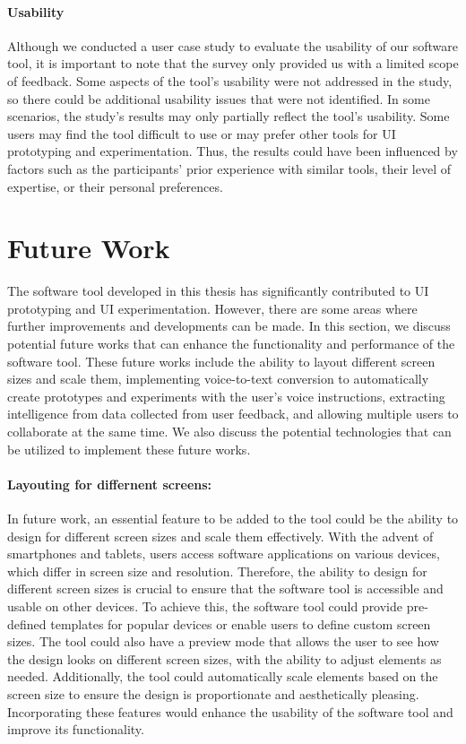 \paragraph{Usability}
Although we conducted a user case study to evaluate the usability of our software tool, it is important to note that the survey only provided us with a limited scope of feedback. 
Some aspects of the tool's usability were not addressed in the study, so there could be additional usability issues that were not identified. In some scenarios, the study's results may only partially reflect the tool's usability.
Some users may find the tool difficult to use or may prefer other tools for UI prototyping and experimentation.
Thus, the results could have been influenced by factors such as the participants' prior experience with similar tools, their level of expertise, or their personal preferences.

\clearpage
\section{Future Work}
\label{section:conclusion:futurework}
The software tool developed in this thesis has significantly contributed to UI prototyping and UI experimentation. 
However, there are some areas where further improvements and developments can be made. 
In this section, we discuss potential future works that can enhance the functionality and performance of the software tool. 
These future works include the ability to layout different screen sizes and scale them, implementing voice-to-text conversion to automatically create prototypes and experiments with the user's voice instructions, extracting intelligence from data collected from user feedback, and allowing multiple users to collaborate at the same time. 
We also discuss the potential technologies that can be utilized to implement these future works.

\paragraph{Layouting for differnent screens:}
In future work, an essential feature to be added to the tool could be the ability to design for different screen sizes and scale them effectively. 
With the advent of smartphones and tablets, users access software applications on various devices, which differ in screen size and resolution. 
Therefore, the ability to design for different screen sizes is crucial to ensure that the software tool is accessible and usable on other devices.
To achieve this, the software tool could provide pre-defined templates for popular devices or enable users to define custom screen sizes. 
The tool could also have a preview mode that allows the user to see how the design looks on different screen sizes, with the ability to adjust elements as needed. 
Additionally, the tool could automatically scale elements based on the screen size to ensure the design is proportionate and aesthetically pleasing. 
Incorporating these features would enhance the usability of the software tool and improve its functionality.

